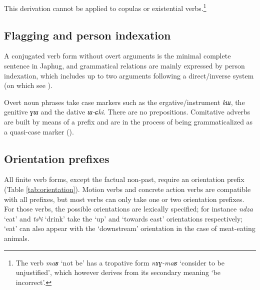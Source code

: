 \documentclass[oneside,a4paper,12pt]{article}
\newcommand{\ipa}[1]{{\phon\textit{#1}}}
\begin{document}
This derivation cannot be applied to copulas or existential verbs.\footnote{The verb \ipa{maʁ} `not be' has a tropative form \ipa{nɤɣ-maʁ} `consider to be unjustified', which however derives from its secondary meaning `be incorrect'.} 

\subsection{Flagging and person indexation}

A conjugated verb form without overt arguments is the minimal complete sentence in Japhug, and grammatical relations are mainly expressed by person indexation, which includes up to two arguments following a direct/inverse system (on which see \citealt{jackson02rentongdengdi, jacques10inverse, gongxun14agreement}).

Overt noun phrases take case markers such as the ergative/instrument \ipa{kɯ}, the genitive \ipa{ɣɯ} and the dative \ipa{ɯ-ɕki}. There are no prepositions. Comitative adverbs are built by means of a prefix and are in the process of being grammaticalized as a quasi-case marker (\citealt{jacques17comitative}).

\subsection{Orientation prefixes} \label{sec:orientation}
All finite verb forms, except the factual non-past, require an orientation prefix (Table \ref{tab:orientation}). Motion verbs and concrete action verbs are compatible with all prefixes, but most verbs can only take one or two orientation prefixes. For those verbs, the possible orientations are lexically specified; for instance \ipa{ndza} `eat' and \ipa{tsʰi} `drink' take the `up' and `towards east' orientations respectively; `eat' can also appear with the `downstream' orientation in the case of meat-eating animals.
\end{document}
